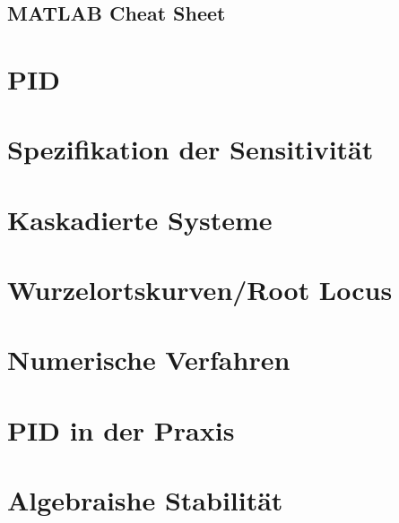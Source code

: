 \begin{multicols*}{2}
\section{MATLAB Cheat Sheet}
        

\end{multicols*}
\begin{multicols*}{3}
\section{PID}
    

\vfill\null\columnbreak
\section{Spezifikation der Sensitivität}
    
    

\vfill\null\columnbreak    
\section{Kaskadierte Systeme}
    

\vfill\null\columnbreak 
\section{Wurzelortskurven/Root Locus}
    

\vfill\null\columnbreak 
\section{Numerische Verfahren}
    
    
\section{PID in der Praxis}
    
    
    
    
\vfill\null\columnbreak
\section{Algebraishe Stabilität}
    
    


\end{multicols*}
